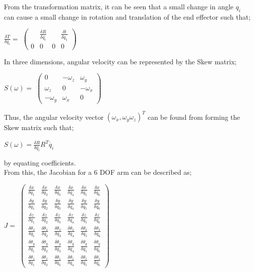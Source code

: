 \documentclass[12pt,openany,a4paper]{book}
\begin{document}
From the transformation matrix, it can be seen that a small change in angle $q_i$ can cause a small change in rotation and translation of the end effector such that;

$\frac{\delta T}{\delta q_i} = $
$ \left(\begin{array}{cccc} & \frac{\delta R}{\delta q_i} & & \frac{\delta t}{\delta q_1}  \\ 0 & 0 & 0 & 0 \end{array}\right)
$

In three dimensions, angular velocity can be represented by the Skew matrix;

$S(\omega) = $
$ \left(\begin{array}{ccc} 0 & -\omega_z & \omega_y \\ \omega_z & 0 & -\omega_x  \\ -\omega_y & \omega_x & 0 \end{array}\right)
$

Thus, the angular velocity vector $(\omega_x, \omega_y \omega_z)^T$ can be found from forming the Skew matrix such that;

$S(\omega) = \frac{\delta R}{\delta q_i} R^T \dot{q_i}$

by equating coefficients.\\

From this, the Jacobian for a 6 DOF arm can be described as;

$J = $
$ \left(\begin{array}{cccccc} 
\frac{\delta x}{\delta q_1} & \frac{\delta x}{\delta q_2} & \frac{\delta x}{\delta q_3} & \frac{\delta x}{\delta q_4} & \frac{\delta x}{\delta q_5} & \frac{\delta x}{\delta q_6} \\ 
\frac{\delta y}{\delta q_1} & \frac{\delta y}{\delta q_2} & \frac{\delta y}{\delta q_3} & \frac{\delta y}{\delta q_4} & \frac{\delta y}{\delta q_5} & \frac{\delta y}{\delta q_6} \\ 
\frac{\delta z}{\delta q_1} & \frac{\delta z}{\delta q_2} & \frac{\delta z}{\delta q_3} & \frac{\delta z}{\delta q_4} & \frac{\delta z}{\delta q_5} & \frac{\delta z}{\delta q_6} \\ 
\frac{\delta \theta_x}{\delta q_1} & \frac{\delta \theta_x}{\delta q_2} & \frac{\delta \theta_x}{\delta q_3} & \frac{\delta \theta_x}{\delta q_4} & \frac{\delta \theta_x}{\delta q_5} & \frac{\delta \theta_x}{\delta q_6} \\ 
\frac{\delta \theta_y}{\delta q_1} & \frac{\delta \theta_y}{\delta q_2} & \frac{\delta \theta_y}{\delta q_3} & \frac{\delta \theta_y}{\delta q_4} & \frac{\delta \theta_y}{\delta q_5} & \frac{\delta \theta_y}{\delta q_6} \\ 
\frac{\delta \theta_z}{\delta q_1} & \frac{\delta \theta_z}{\delta q_2} & \frac{\delta \theta_z}{\delta q_3} & \frac{\delta \theta_z}{\delta q_4} & \frac{\delta \theta_z}{\delta q_5} & \frac{\delta \theta_z}{\delta q_6} 
\end{array}\right)
$
\end{document}
